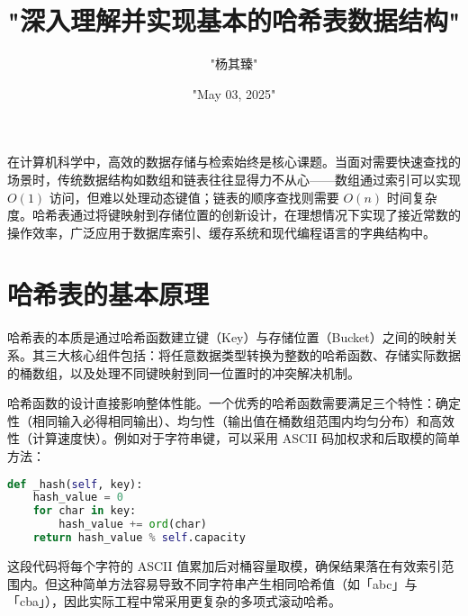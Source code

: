 \title{"深入理解并实现基本的哈希表数据结构"}
\author{"杨其臻"}
\date{"May 03, 2025"}
\maketitle
在计算机科学中，高效的数据存储与检索始终是核心课题。当面对需要快速查找的场景时，传统数据结构如数组和链表往往显得力不从心——数组通过索引可以实现 $O(1)$ 访问，但难以处理动态键值；链表的顺序查找则需要 $O(n)$ 时间复杂度。哈希表通过将键映射到存储位置的创新设计，在理想情况下实现了接近常数的操作效率，广泛应用于数据库索引、缓存系统和现代编程语言的字典结构中。\par
\chapter{哈希表的基本原理}
哈希表的本质是通过哈希函数建立键（Key）与存储位置（Bucket）之间的映射关系。其三大核心组件包括：将任意数据类型转换为整数的哈希函数、存储实际数据的桶数组，以及处理不同键映射到同一位置时的冲突解决机制。\par
哈希函数的设计直接影响整体性能。一个优秀的哈希函数需要满足三个特性：确定性（相同输入必得相同输出）、均匀性（输出值在桶数组范围内均匀分布）和高效性（计算速度快）。例如对于字符串键，可以采用 ASCII 码加权求和后取模的简单方法：\par
\begin{lstlisting}[language=python]
def _hash(self, key):
    hash_value = 0
    for char in key:
        hash_value += ord(char)
    return hash_value % self.capacity
\end{lstlisting}
这段代码将每个字符的 ASCII 值累加后对桶容量取模，确保结果落在有效索引范围内。但这种简单方法容易导致不同字符串产生相同哈希值（如「abc」与「cba」），因此实际工程中常采用更复杂的多项式滚动哈希。\par
